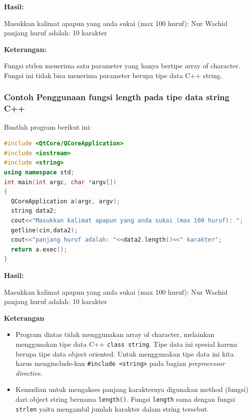 \textbf{Hasil:}

\begin{lcverbatim}
Masukkan kalimat apapun
yang anda sukai (max 100 huruf): Nur Wachid 
panjang huruf adalah: 10 karakter
\end{lcverbatim}
 

\textbf{Keterangan:}

Fungsi strlen menerima satu parameter yang hanya bertipe array of
character. Fungsi ini tidak bisa menerima parameter berupa tipe data C++
string.

\subsubsection*{Contoh  Penggunaan fungsi length pada tipe data string C++}

Buatlah program berikut ini:

\begin{lstlisting}[language=c++, caption=Penggunaan fungsi length pada tipe data string C++, label=contoh3-19]
#include <QtCore/QCoreApplication>
#include <iostream>
#include <string>
using namespace std;
int main(int argc, char *argv[])
{
  QCoreApplication a(argc, argv);
  string data2;
  cout<<"Masukkan kalimat apapun yang anda sukai (max 100 huruf): ";
  getline(cin,data2);
  cout<<"panjang huruf adalah: "<<data2.length()<<" karakter";
  return a.exec();
}
\end{lstlisting}

\textbf{Hasil:}

\begin{lcverbatim}
Masukkan kalimat apapun yang anda sukai
(max 100 huruf): Nur Wachid 
panjang huruf adalah: 10 karakter
\end{lcverbatim}
 

\textbf{Keterangan}

\begin{itemize}

\item
  Program diatas tidak menggunakan array of character, melainkan
  menggunakan tipe data C++ \texttt{class\ string}. Tipe data ini
  spesial karena berupa tipe data object oriented. Untuk menggunakan
  tipe data ini kita harus menginclude-kan
  \texttt{\#include\ \textless{}string\textgreater{}} pada bagian
  \emph{preprocessor directive}.
\item
  Kemudian untuk mengakses panjang karakternya digunakan method (fungsi)
  dari object string bernama \texttt{length()}. Fungsi \texttt{length}
  sama dengan fungsi \texttt{strlen} yaitu mengambil jumlah karakter
  dalam string tersebut.
\end{itemize}

